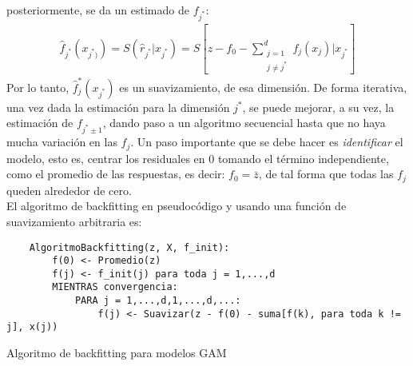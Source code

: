 \documentclass[../Main/Main.tex]{subfiles}
\begin{document}
posteriormente, se da un estimado de $f_{j^*}$:
\begin{align}
	\hat{f}_{j^*}(x_{j^*)}) = S(\hat{r}_{j^*}|x_{j^*}) = S[z - f_0 - \sum_{\substack{j=1\\ j \neq j^*}}^d f_j(x_j)|x_{j^*}]
\end{align}
Por lo tanto, $\hat{f}_j^*(x_{j^*})$ es un suavizamiento, de esa dimensión. De forma iterativa, una vez dada la estimación para la  dimensión $j^*$, se puede mejorar, a su vez, la estimación de $f_{j^*\pm 1}$, dando paso a un algoritmo secuencial hasta que no haya mucha variación en las $f_j$. Un paso importante que se debe hacer es \textit{identificar} el modelo, esto es, centrar los residuales en $0$ tomando el término independiente, como el promedio de las respuestas, es decir: $f_0 = \bar{z}$, de tal forma que todas las $f_j$ queden alrededor de cero. \\

El algoritmo de backfitting en pseudocódigo y usando una función de suavizamiento arbitraria es:\\
\begin{table}
\makebox[\linewidth]{\rule{\textwidth}{0.4pt}}
\begin{verbatim}
    AlgoritmoBackfitting(z, X, f_init):
        f(0) <- Promedio(z)
        f(j) <- f_init(j) para toda j = 1,...,d
        MIENTRAS convergencia:
            PARA j = 1,...,d,1,...,d,...:
                f(j) <- Suavizar(z - f(0) - suma[f(k), para toda k != j], x(j)) 
\end{verbatim}
\makebox[\linewidth]{\rule{\textwidth}{0.4pt}}
\caption{Algoritmo de backfitting para modelos GAM}
\label{alg:Backfitting}
\end{table}
\end{document}
